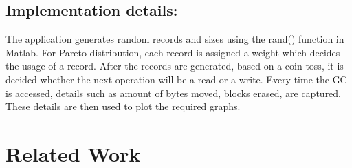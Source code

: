 \subsection{Implementation details:}
The application generates random records and sizes using the rand() function in Matlab. For Pareto distribution, each record is assigned a weight which decides the usage of a record. After the records are generated, based on a coin toss, it is decided whether the next operation will be a read or a write. Every time the GC is accessed, details such as amount of bytes moved, blocks erased, are captured. These details are then used to plot the required graphs. 

\section{Related Work}


